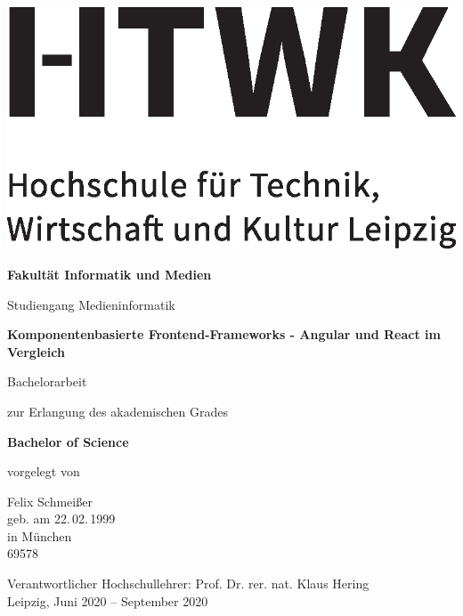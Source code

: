 \begin{titlepage}
{\centering
\includegraphics[]{Hilfsdateien/HTWK_logo.eps}\\[8ex]
{\large \textbf{Fakultät Informatik und Medien} \par}
{\large Studiengang Medieninformatik \par}
\vspace{1.75cm}
{\Large \textbf{Komponentenbasierte Frontend-Frameworks - Angular und React im Vergleich}\par}
\vspace{1.25cm}
{Bachelorarbeit \par}
{zur Erlangung des akademischen Grades \par} 
{\large  \textbf{Bachelor of Science} \par}
\vspace{1.25cm}
{\large vorgelegt von \par}
\vspace{1.25cm}
{Felix Schmeißer\\[3ex]
geb. am 22.\,02.\,1999\\[3ex]
in München\\[3ex]
69578 \par}}
\vfill
{\noindent Verantwortlicher Hochschullehrer: Prof. Dr. rer. nat. Klaus Hering\\
Leipzig, Juni 2020 -- September 2020}
\end{titlepage}

